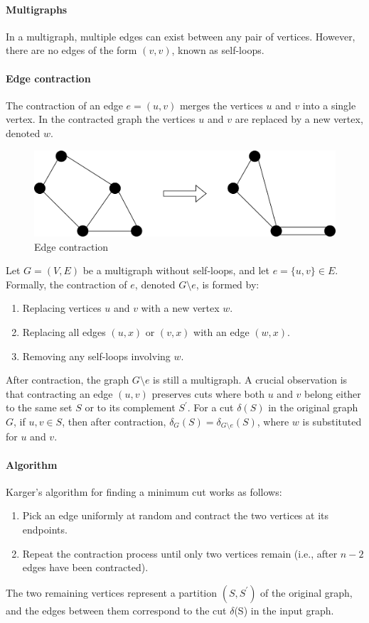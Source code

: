 \paragraph*{Multigraphs}
In a multigraph, multiple edges can exist between any pair of vertices. 
However, there are no edges of the form $(v,v)$, known as self-loops. 

\paragraph*{Edge contraction}
The contraction of an edge $e=(u,v)$ merges the vertices $u$ and $v$ into a single vertex. 
In the contracted graph the vertices $u$ and $v$ are replaced by a new vertex, denoted $w$.
\begin{figure}[H]
    \centering
    \includegraphics[width=0.8\linewidth]{images/ed.png}
    \caption{Edge contraction}
\end{figure}
Let $G=(V,E)$ be a multigraph without self-loops, and let $e=\{u,v\}\in E$. 
Formally, the contraction of $e$, denoted $G\setminus e$, is formed by:
\begin{enumerate}
    \item Replacing vertices $u$ and $v$ with a new vertex $w$.
    \item Replacing all edges $(u,x)$ or $(v,x)$ with an edge $(w,x)$.
    \item Removing any self-loops involving $w$.
\end{enumerate}
After contraction, the graph $G\setminus e$ is still a multigraph. 
A crucial observation is that contracting an edge $(u,v)$ preserves cuts where both $u$ and $v$ belong either to the same set $S$ or to its complement $S^\prime$.
For a cut $\delta(S)$ in the original graph $G$, if $u,v\in S$, then after contraction, $\delta_G(S)=\delta_{G\setminus e}(S)$, where $w$ is substituted for $u$ and $v$.

\paragraph*{Algorithm}
Karger's algorithm for finding a minimum cut works as follows:
\begin{enumerate}
    \item Pick an edge uniformly at random and contract the two vertices at its endpoints.
    \item Repeat the contraction process until only two vertices remain (i.e., after $n-2$ edges have been contracted).
\end{enumerate}
The two remaining vertices represent a partition $(S, S^\prime)$ of the original graph, and the edges between them correspond to the cut $\delta$(S) in the input graph.

